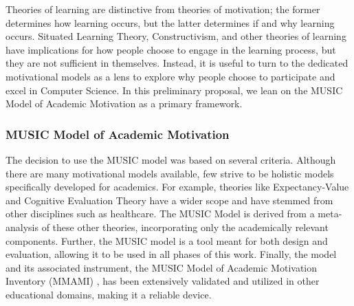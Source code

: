 Theories of learning are distinctive from theories of motivation; the former determines how learning occurs, but the latter determines if and why learning occurs.
Situated Learning Theory, Constructivism, and other theories of learning have implications for how people choose to engage in the learning process, but they are not sufficient in themselves.
Instead, it is useful to turn to the dedicated motivational models as a lens to explore why people choose to participate and excel in Computer Science.
In this preliminary proposal, we lean on the MUSIC Model of Academic Motivation as a primary framework.

\subsubsection{MUSIC Model of Academic Motivation}

The decision to use the MUSIC model was based on several criteria.
Although there are many motivational models available, few strive to be holistic models specifically developed for academics.
For example, theories like Expectancy-Value and Cognitive Evaluation Theory have a wider scope and have stemmed from other disciplines such as healthcare.
The MUSIC Model is derived from a meta-analysis of these other theories, incorporating only the academically relevant components.
Further, the MUSIC model is a tool meant for both design and evaluation, allowing it to be used in all phases of this work.
Finally, the model and its associated instrument, the MUSIC Model of Academic Motivation Inventory (MMAMI) , has been extensively validated and utilized in other educational domains, making it a reliable device\cite{jones-validity}.

